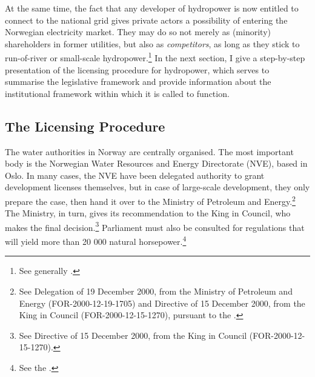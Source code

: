 At the same time, the fact that any developer of hydropower is now entitled to connect to the national grid gives private actors a possibility of entering the Norwegian electricity market. They may do so not merely as (minority) shareholders in former utilities, but also as {\it competitors}, as long as they stick to run-of-river or small-scale hydropower.\footnote{See generally \cite{larsen06,larsen08,larsen12}.} In the next section, I give a step-by-step presentation of the licensing procedure for hydropower, which serves to summarise the legislative framework and provide information about the institutional framework within which it is called to function.

\subsection{The Licensing Procedure}\label{sec:4:3:1}

The water authorities in Norway are centrally organised. The most important body is the Norwegian Water Resources and Energy Directorate (NVE), based in Oslo. In many cases, the NVE have been delegated authority to grant development licenses themselves, but in case of large-scale development, they only prepare the case, then hand it over to the Ministry of Petroleum and Energy.\footnote{See Delegation of 19 December 2000, from the Ministry of Petroleum and Energy (FOR-2000-12-19-1705) and Directive of 15 December 2000, from the King in Council (FOR-2000-12-15-1270), pursuant to the \dni\cite[64]{wra00}.} The Ministry, in turn, gives its recommendation to the King in Council, who makes the final decision.\footnote{See Directive of 15 December 2000, from the King in Council (FOR-2000-12-15-1270).} Parliament must also be consulted for regulations that will yield more than 20 000 natural horsepower.\footnote{See the \dni\cite[2]{wra17}.}

